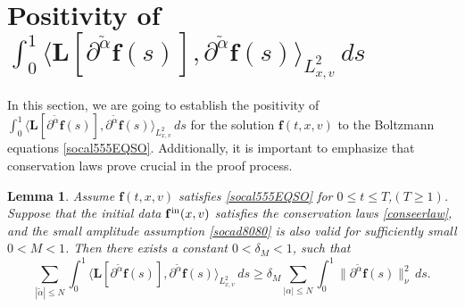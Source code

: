 \documentclass[reqno]{amsart}
\numberwithin{equation}{section}
\newtheorem{lemma}[theorem]{Lemma}
\numberwithin{equation}{section}
\begin{document}
		\section{Positivity of $\int_{0}^{1} \big\langle \mathbf{L}[\partial^{\tilde{\alpha}} \mathbf{f} (s)], \partial^{\tilde{\alpha}} \mathbf{f} (s) \big\rangle_{L^{2}_{x,v}} \, ds$}
		In this section, we are going to establish the positivity of $\int_{0}^{1} \big\langle \mathbf{L}[\partial^{\tilde{\alpha}} \mathbf{f} (s)], \partial^{\tilde{\alpha}} \mathbf{f} (s) \big\rangle_{L^{2}_{x,v}} \, ds$ for the solution $\mathbf{f}(t,x,v)$ to the Boltzmann equations \eqref{socal555EQSO}. Additionally, it is important to emphasize that conservation laws prove crucial in the proof process.
		
		
		
		\begin{lemma}\label{socedlem9}
		Assume $ \mathbf{f}(t, x, v) $ satisfies \eqref{socal555EQSO} for $ 0 \leq t \leq T $,$ (T \geq 1) $. Suppose that the initial data $ \mathbf{f}^{\rm{in}}(x, v) $ satisfies the conservation laws \eqref{conseerlaw}, and the small amplitude assumption \eqref{socad8080} is also valid for sufficiently small $ 0 <M<1 $. Then there exists a constant $ 0 < \delta_M < 1 $, such that
		\begin{equation}\label{socedlem9ct}
		\sum_{|\tilde{\alpha}| \le N} \int_{0}^{1} \big\langle \mathbf{L}[\partial^{\tilde{\alpha}} \mathbf{f} (s)], \partial^{\tilde{\alpha}} \mathbf{f} (s) \big\rangle_{L^{2}_{x,v}} \, ds \geq \delta_M \sum_{|\alpha| \le N} \int_0^1 \|\partial^{\tilde{\alpha}} \mathbf{f}(s)\|_{\nu}^2 \,ds.
		\end{equation}
		\end{lemma}
		
\end{document}

